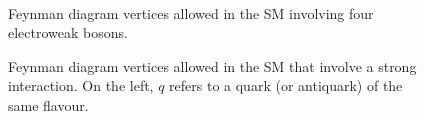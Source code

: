\begin{figure}
  \centering
   \\
  \caption[Four-Point Electroweak Boson Feynman Diagram Vertices]{Feynman diagram vertices allowed in the SM involving four electroweak bosons.}\label{fig:electroweak_4_point_boson_vertices}
\end{figure}

\begin{figure}
  \centering
  \caption[Strong Feynman Diagram Vertices]{Feynman diagram vertices allowed in the SM that involve a strong interaction. On the left, $q$ refers to a quark (or antiquark) of the same flavour.}\label{fig:strong_vertices}
\end{figure}